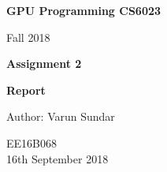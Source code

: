 \begin{titlepage}
    \begin{center}
        \vspace*{1cm}
        
        \Huge
          \textbf{GPU Programming CS6023}
        
        \vspace{0.5cm}
        \LARGE
        Fall 2018
        
        \vspace{1.5cm}
        
        \textbf{Assignment 2}
   		  \vspace{1.5cm}
        
        \textbf{Report}
       
        \vfill
        
        Author: Varun Sundar
        
        \vspace{0.8cm}
          \Large
        EE16B068 \\
        \vspace{0.5cm}
       16th September 2018
        
    \end{center}
\end{titlepage}